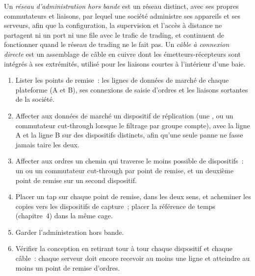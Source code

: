\begin{definition}\label{def:nw:switches-and-layer-1-devices:oob}
Un \emph{réseau d'administration hors bande} est un réseau distinct, avec ses propres commutateurs et
liaisons, par lequel une société administre ses appareils et ses serveurs, afin que la configuration, la supervision et l'accès à distance ne
partagent ni un port ni une file avec le trafic de trading, et continuent de fonctionner quand le réseau de trading ne le fait pas. Un \emph{câble à connexion directe}
est un assemblage de câble en cuivre dont les émetteurs-récepteurs sont intégrés à ses extrémités, utilisé pour les liaisons courtes
à l'intérieur d'une baie.
\end{definition}

\begin{method}\label{met:nw:switches-and-layer-1-devices:design}
\begin{enumerate}
\item Lister les points de remise~: les lignes de données de marché de chaque plateforme (A et B), ses connexions de saisie d'ordres et les liaisons sortantes de la société.
\item Affecter aux données de marché un dispositif de réplication (une , ou un commutateur cut-through lorsque le filtrage par groupe compte), avec
  la ligne A et la ligne B sur des dispositifs distincts, afin qu'une seule panne ne fasse jamais taire les deux.
\item Affecter aux ordres un chemin qui traverse le moins possible de dispositifs~: un  ou un commutateur cut-through par point de remise, et
  un deuxième point de remise sur un second dispositif.
\item Placer un tap sur chaque point de remise, dans les deux sens, et acheminer les copies vers les dispositifs de capture~; placer la référence de temps
  (chapitre~4) dans la même cage.
\item Garder l'administration hors bande.
\item Vérifier la conception en retirant tour à tour chaque dispositif et chaque câble~: chaque serveur doit encore recevoir au moins une ligne et
  atteindre au moins un point de remise d'ordres.
\end{enumerate}
\end{method}

